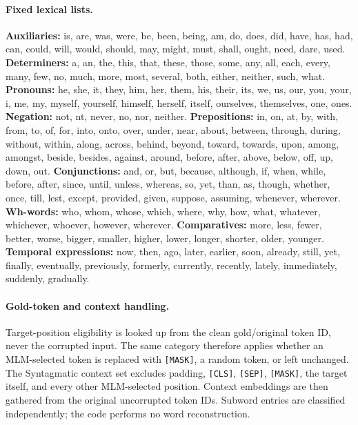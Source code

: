 \paragraph{Fixed lexical lists.}
\textbf{Auxiliaries:} is, are, was, were, be, been, being, am, do, does,
did, have, has, had, can, could, will, would, should, may, might, must,
shall, ought, need, dare, used.
\textbf{Determiners:} a, an, the, this, that, these, those, some, any,
all, each, every, many, few, no, much, more, most, several, both,
either, neither, such, what.
\textbf{Pronouns:} he, she, it, they, him, her, them, his, their, its,
we, us, our, you, your, i, me, my, myself, yourself, himself, herself,
itself, ourselves, themselves, one, ones.
\textbf{Negation:} not, n\textquotesingle t, never, no, nor, neither.
\textbf{Prepositions:} in, on, at, by, with, from, to, of, for, into,
onto, over, under, near, about, between, through, during, without,
within, along, across, behind, beyond, toward, towards, upon, among,
amongst, beside, besides, against, around, before, after, above, below,
off, up, down, out.
\textbf{Conjunctions:} and, or, but, because, although, if, when, while,
before, after, since, until, unless, whereas, so, yet, than, as, though,
whether, once, till, lest, except, provided, given, suppose, assuming,
whenever, wherever.
\textbf{Wh-words:} who, whom, whose, which, where, why, how, what,
whatever, whichever, whoever, however, wherever.
\textbf{Comparatives:} more, less, fewer, better, worse, bigger,
smaller, higher, lower, longer, shorter, older, younger.
\textbf{Temporal expressions:} now, then, ago, later, earlier, soon,
already, still, yet, finally, eventually, previously, formerly,
currently, recently, lately, immediately, suddenly, gradually.

\paragraph{Gold-token and context handling.}
Target-position eligibility is looked up from the clean gold/original
token ID, never the corrupted input. The same category therefore
applies whether an MLM-selected token is replaced with \texttt{[MASK]},
a random token, or left unchanged. The Syntagmatic context set excludes
padding, \texttt{[CLS]}, \texttt{[SEP]}, \texttt{[MASK]}, the target
itself, and every other MLM-selected position. Context embeddings are
then gathered from the original uncorrupted token IDs. Subword entries
are classified independently; the code performs no word reconstruction.

